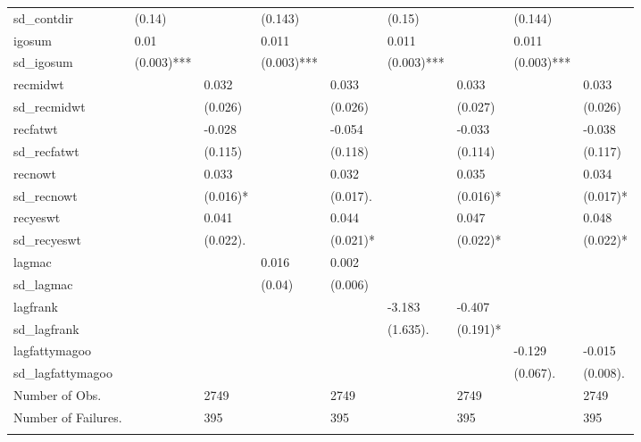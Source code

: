 \begin{table}[ht]
\begin{tabular}{lllllllll}
  sd\_contdir & (0.14)  &  & (0.143)  &  & (0.15)  &  & (0.144)  &  \\ 
  igosum & 0.01 &  & 0.011 &  & 0.011 &  & 0.011 &  \\ 
  sd\_igosum & (0.003)*** &  & (0.003)*** &  & (0.003)*** &  & (0.003)*** &  \\ 
  recmidwt &  & 0.032 &  & 0.033 &  & 0.033 &  & 0.033 \\ 
  sd\_recmidwt &  & (0.026)  &  & (0.026)  &  & (0.027)  &  & (0.026)  \\ 
  recfatwt &  & -0.028 &  & -0.054 &  & -0.033 &  & -0.038 \\ 
  sd\_recfatwt &  & (0.115)  &  & (0.118)  &  & (0.114)  &  & (0.117)  \\ 
  recnowt &  & 0.033 &  & 0.032 &  & 0.035 &  & 0.034 \\ 
  sd\_recnowt &  & (0.016)* &  & (0.017). &  & (0.016)* &  & (0.017)* \\ 
  recyeswt &  & 0.041 &  & 0.044 &  & 0.047 &  & 0.048 \\ 
  sd\_recyeswt &  & (0.022). &  & (0.021)* &  & (0.022)* &  & (0.022)* \\ 
  lagmac &  &  & 0.016 & 0.002 &  &  &  &  \\ 
  sd\_lagmac &  &  & (0.04)  & (0.006)  &  &  &  &  \\ 
  lagfrank &  &  &  &  & -3.183 & -0.407 &  &  \\ 
  sd\_lagfrank &  &  &  &  & (1.635). & (0.191)* &  &  \\ 
  lagfattymagoo &  &  &  &  &  &  & -0.129 & -0.015 \\ 
  sd\_lagfattymagoo &  &  &  &  &  &  & (0.067). & (0.008). \\ 
  Number of Obs. &  & 2749 &  & 2749 &  & 2749 &  & 2749 \\ 
  Number of Failures. &  & 395 &  & 395 &  & 395 &  & 395 \\ 
   \hline \footnotesize{  }
\end{tabular}
\end{table}
